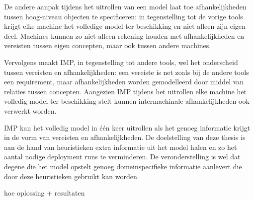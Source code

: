 De andere aanpak tijdens het uitrollen van een model laat toe afhankelijkheden tussen hoog-niveau objecten te specificeren:
in tegenstelling tot de vorige tools krijgt elke machine het volledige model ter beschikking en niet alleen zijn eigen deel.
Machines kunnen zo niet alleen rekening houden met afhankelijkheden en vereisten tussen eigen concepten, maar ook tussen andere machines.

Vervolgens maakt IMP, in tegenstelling tot andere tools, wel het onderscheid tussen vereisten en afhankelijkheden:
een vereiste is net zoals bij de andere tools een requirement, maar afhankelijkheden worden gemodelleerd door middel van relaties tussen concepten.
Aangezien IMP tijdens het uitrollen elke machine het volledig model ter beschikking stelt kunnen intermachinale afhankelijkheden ook verwerkt worden.

IMP kan het volledig model in \'e\'en keer uitrollen als het genoeg informatie krijgt in de vorm van vereisten en afhankelijkheden.
De doelstelling van deze thesis is aan de hand van heuristieken extra informatie uit het model halen en zo het aantal nodige deployment runs te verminderen.
De veronderstelling is wel dat degene die het model opstelt genoeg domeinspecifieke informatie aanlevert die door deze heuristieken gebruikt kan worden.

 hoe oplossing + resultaten
